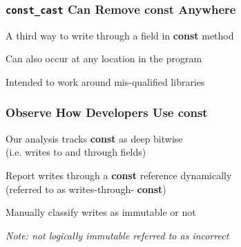 \documentclass[aspectratio=43]{beamer}
\newcommand{\const}{{\color{blue} \bfseries \ttfamily const}}
\begin{document}
  \begin{frame}
    \frametitle{\texttt{const\_cast} Can Remove \const{} Anywhere}
    \large
    A third way to write through a field in \const{} method

    \vspace{2em}
    Can also occur at any location in the program

    \vspace{2em}
    Intended to work around mis-qualified libraries
  \end{frame}

  \begin{frame}
    \frametitle{Observe How Developers Use \const{}}

    \large

    Our analysis tracks \const{} as deep bitwise
    \\(i.e. writes to and through fields)

    \vspace{2em}
    Report writes through a \const{} reference dynamically
    \\(referred to as writes-through-\const{})

    \vspace{2em}
    {\color{yellow} Manually classify writes as  immutable
    or not}

    \vspace{2em}
    \textit{Note: not logically immutable referred to as incorrect}
  \end{frame}
\end{document}
